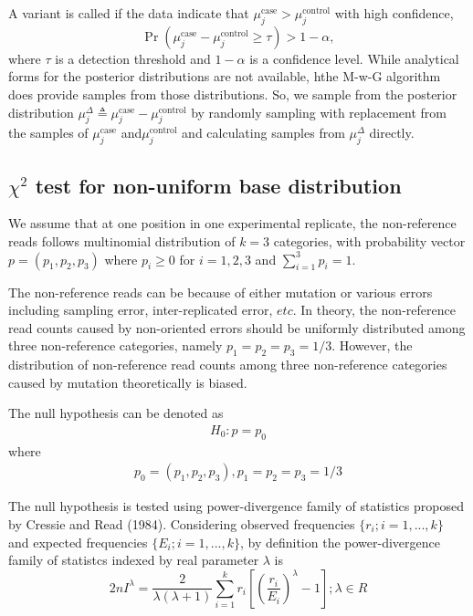 \documentclass[11pt,reqno]{amsart}
\begin{document}
A variant is called if the data indicate that $\mu_j^{\text{case}} > \mu_j^{\text{control}}$ with high confidence,
\begin{equation}
	\Pr( \mu_j^{\text{case}} - \mu_j^{\text{control}} \geq \tau ) > 1-\alpha,
\end{equation}
where $\tau$ is a detection threshold and $1-\alpha$ is a confidence level. While analytical forms for the posterior distributions are not available, hthe M-w-G algorithm does provide samples from those distributions. So, we sample from the posterior distribution $\mu_j^{\Delta} \triangleq \mu_j^{\text{case}} - \mu_j^{\text{control}}$ by randomly sampling with replacement from the samples of $\mu_j^{\text{case}}$ and$\mu_j^{\text{control}}$ and calculating samples from $\mu_j^{\Delta}$ directly.

\subsection{$\chi^2$ test for non-uniform base distribution}

We assume that at one position in one experimental replicate, the non-reference reads follows multinomial distribution of $k = 3$ categories, with probability vector $p = (p_1, p_2, p_3)$ where $p_i \geq 0$ for $i =1, 2, 3$ and $\sum_{i=1}^3 p_i = 1$.

The non-reference reads can be because of either mutation or various errors including sampling error, inter-replicated error, $etc$. In theory, the non-reference read counts caused by non-oriented errors should be uniformly distributed among three non-reference categories, namely $p_1=p_2=p_3=1/3$. However, the distribution of non-reference read counts among three non-reference categories caused by mutation theoretically is biased. 

The null hypothesis can be denoted as
\begin{align}
 H_0: p=p_0
\end{align}
where
\begin{align} 
 p_0=(p_1,p_2,p_3), p_1=p_2=p_3=1/3
\end{align}

The null hypothesis is tested using power-divergence family of statistics proposed by Cressie and Read (1984). Considering observed frequencies $\{r_i; i=1,...,k\}$ and expected frequencies $\{E_i; i=1,...,k\}$, by definition the power-divergence family of statistcs indexed by real parameter $\lambda$ is 
\begin{equation}
 2nI^\lambda = \frac{2}{\lambda(\lambda+1)}\sum_{i=1}^k r_i \left[\left(\frac{r_i}{E_i}\right)^\lambda-1\right];\lambda \in R
\end{equation}
\end{document}
